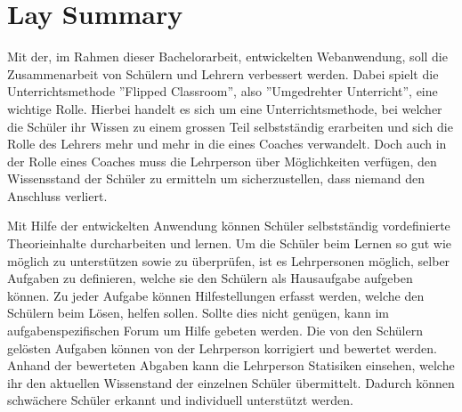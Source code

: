 \section*{Lay Summary}

Mit der, im Rahmen dieser Bachelorarbeit, entwickelten Webanwendung, soll die Zusammenarbeit von Schülern und Lehrern verbessert werden. Dabei spielt die Unterrichtsmethode ''Flipped Classroom'', also ''Umgedrehter Unterricht'', eine wichtige Rolle. Hierbei handelt es sich um eine Unterrichtsmethode, bei welcher die Schüler ihr Wissen zu einem grossen Teil selbstständig erarbeiten und sich die Rolle des Lehrers mehr und mehr in die eines Coaches verwandelt. Doch auch in der Rolle eines Coaches muss die Lehrperson über Möglichkeiten verfügen, den Wissensstand der Schüler zu ermitteln um sicherzustellen, dass niemand den Anschluss verliert.


Mit Hilfe der entwickelten Anwendung können Schüler selbstständig vordefinierte Theorieinhalte durcharbeiten und lernen. Um die Schüler beim Lernen so gut wie möglich zu unterstützen sowie zu überprüfen, ist es Lehrpersonen möglich, selber Aufgaben zu definieren, welche sie den Schülern als Hausaufgabe aufgeben können. Zu jeder Aufgabe können Hilfestellungen erfasst werden, welche den Schülern beim Lösen, helfen sollen. Sollte dies nicht genügen, kann im aufgabenspezifischen Forum um Hilfe gebeten werden. Die von den Schülern gelösten Aufgaben können von der Lehrperson korrigiert und bewertet werden. Anhand der bewerteten Abgaben kann die Lehrperson Statisiken einsehen, welche ihr den aktuellen Wissenstand der einzelnen Schüler übermittelt. Dadurch können schwächere Schüler erkannt und individuell unterstützt werden. 


\newpage